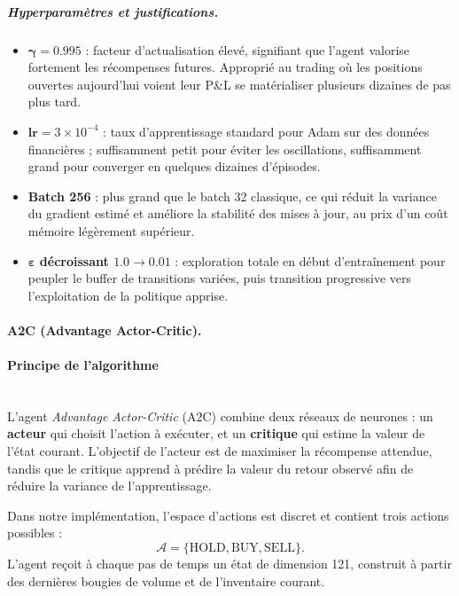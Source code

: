 \documentclass[11pt,a4paper]{article}
\begin{document}
\subparagraph{Hyperparamètres et justifications.}

\begin{itemize}[leftmargin=1.2cm]
  \item $\boldsymbol{\gamma = 0.995}$ : facteur d'actualisation
        élevé, signifiant que l'agent valorise fortement les
        récompenses futures. Approprié au trading où les positions
        ouvertes aujourd'hui voient leur P\&L se matérialiser
        plusieurs dizaines de pas plus tard.
  \item $\textbf{lr} = 3\times 10^{-4}$ : taux d'apprentissage
        standard pour Adam sur des données financières ; suffisamment
        petit pour éviter les oscillations, suffisamment grand pour
        converger en quelques dizaines d'épisodes.
  \item \textbf{Batch 256} : plus grand que le batch 32 classique,
        ce qui réduit la variance du gradient estimé et améliore la
        stabilité des mises à jour, au prix d'un coût mémoire
        légèrement supérieur.
  \item $\boldsymbol{\varepsilon}$ \textbf{décroissant
        $1.0 \to 0.01$} : exploration totale en début
        d'entraînement pour peupler le buffer de transitions variées,
        puis transition progressive vers l'exploitation de la
        politique apprise.
\end{itemize}

\paragraph{A2C (Advantage Actor-Critic).}
\paragraph{Principe de l'algorithme}\mbox{} \\

L'agent \textit{Advantage Actor-Critic} (A2C) combine deux réseaux de neurones :
un \textbf{acteur} qui choisit l'action à exécuter, et un \textbf{critique}
qui estime la valeur de l'état courant. L'objectif de l'acteur est de
maximiser la récompense attendue, tandis que le critique apprend à prédire
la valeur du retour observé afin de réduire la variance de l'apprentissage.

Dans notre implémentation, l'espace d'actions est discret et contient trois
actions possibles :
\[
\mathcal{A} = \{\text{HOLD}, \text{BUY}, \text{SELL}\}.
\]
L'agent reçoit à chaque pas de temps un état de dimension 121, construit à
partir des dernières bougies de volume et de l'inventaire courant.
\end{document}
